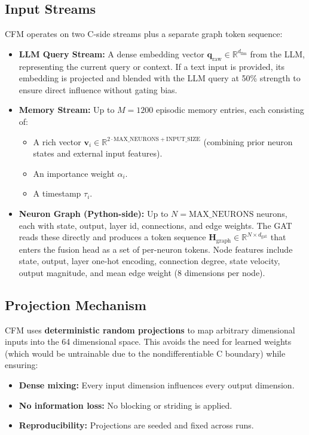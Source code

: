 \documentclass[12pt]{article}
\begin{document}
\subsection{Input Streams}
\label{subsec:input_streams}

CFM operates on two C-side streams plus a separate graph token sequence:

\begin{itemize}
    \item \textbf{LLM Query Stream:}
    A dense embedding vector $\mathbf{q}_{\text{raw}} \in
    \mathbb{R}^{d_{\text{llm}}}$ from the LLM, representing the
    current query or context. If a text input is provided, its
    embedding is projected and blended with the LLM query at 50\%
    strength to ensure direct influence without gating bias.

    \item \textbf{Memory Stream:}
    Up to $M = 1200$ episodic memory entries, each consisting of:
    \begin{itemize}
        \item A rich vector $\mathbf{v}_i \in
        \mathbb{R}^{2 \cdot \text{MAX\_NEURONS} + \text{INPUT\_SIZE}}$
        (combining prior neuron states and external input features).
        \item An importance weight $\alpha_i$.
        \item A timestamp $\tau_i$.
    \end{itemize}

    \item \textbf{Neuron Graph (Python-side):}
    Up to $N = \text{MAX\_NEURONS}$ neurons, each with state, output,
    layer id, connections, and edge weights. The GAT reads these
    directly and produces a token sequence
    $\mathbf{H}_{\text{graph}} \in
    \mathbb{R}^{N \times d_{\text{gat}}}$ that enters the fusion head
    as a set of per-neuron tokens. Node features include state,
    output, layer one-hot encoding, connection degree, state velocity,
    output magnitude, and mean edge weight (8 dimensions per node).
\end{itemize}

\subsection{Projection Mechanism}
\label{subsec:projection}

CFM uses \textbf{deterministic random projections} to map arbitrary
dimensional inputs into the 64 dimensional space. This avoids the
need for learned weights (which would be untrainable due to the
nondifferentiable C boundary) while ensuring:
\begin{itemize}
    \item \textbf{Dense mixing:} Every input dimension influences
    every output dimension.
    \item \textbf{No information loss:} No blocking or striding is
    applied.
    \item \textbf{Reproducibility:} Projections are seeded and fixed
    across runs.
\end{itemize}
\end{document}

